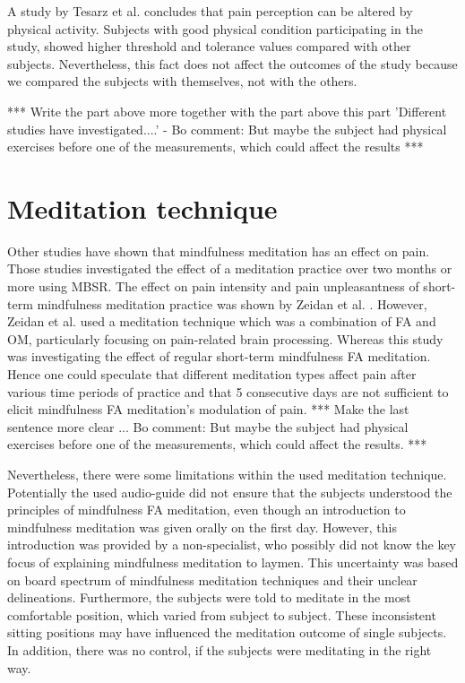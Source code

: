 A study by Tesarz et al. \cite{Tesarz2012} concludes that pain perception can be altered by physical activity. Subjects with good physical condition participating in the study, showed higher threshold and tolerance values compared with other subjects. Nevertheless, this fact does not affect the outcomes of the study because we compared the subjects with themselves, not with the others.

*** Write the part above more together with the part above this part 'Different studies have investigated....' - Bo comment: But maybe the subject had physical exercises before one of the measurements, which could affect the results ***

\section{Meditation technique}
Other studies have shown that mindfulness meditation has an effect on pain. Those studies investigated the effect of a meditation practice over two months or more using MBSR. \cite{Kabat1982,Rosenzweig2010} The effect on pain intensity and pain unpleasantness of short-term mindfulness meditation practice was shown by Zeidan et al. \cite{Zeidan2012}. However, Zeidan et al. \cite{Zeidan2012} used a meditation technique which was a combination of FA and OM, particularly focusing on pain-related brain processing. Whereas this study was investigating the effect of regular short-term mindfulness FA meditation. Hence one could speculate that different meditation types affect pain after various time periods of practice and that 5 consecutive days are not sufficient to elicit mindfulness FA meditation’s modulation of pain.
*** Make the last sentence more clear ... Bo comment: But maybe the subject had physical exercises before one of the measurements, which could affect the results. ***

Nevertheless, there were some limitations within the used meditation technique. Potentially the used audio-guide did not ensure that the subjects understood the principles of mindfulness FA meditation, even though an introduction to mindfulness meditation was given orally on the first day. However, this introduction was provided by a non-specialist, who possibly did not know the key focus of explaining mindfulness meditation to laymen. This uncertainty was based on board spectrum of mindfulness meditation techniques and their unclear delineations. 
Furthermore, the subjects were told to meditate in the most comfortable position, which varied from subject to subject. These inconsistent sitting positions may have influenced the meditation outcome of single subjects. In addition, there was no control, if the subjects were meditating in the right way.
